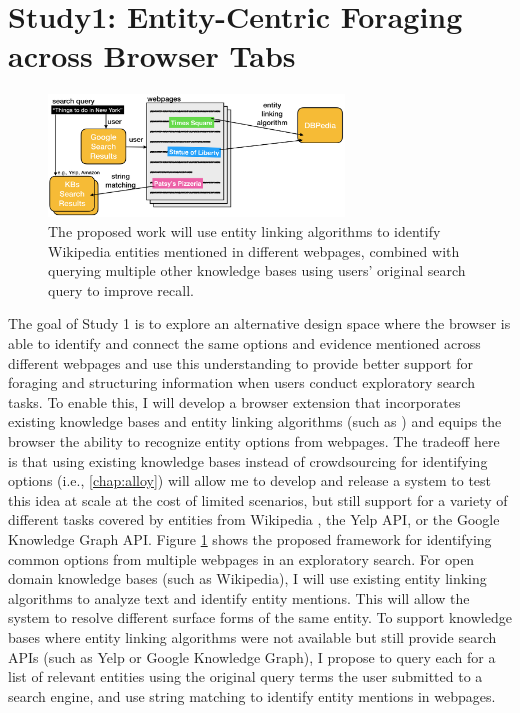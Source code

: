 
\section{Study1: Entity-Centric Foraging across Browser Tabs}

\begin{figure}
    \centering
    \includegraphics[width=0.7\textwidth]{images/linking.png}
    \caption{The proposed work will use entity linking algorithms to identify Wikipedia entities mentioned in different webpages, combined with querying multiple other knowledge bases using users' original search query to improve recall.}
    \label{fig:linking}
\end{figure}


The goal of Study 1 is to explore an alternative design space where the browser is able to identify and connect the same options and evidence mentioned across different webpages and use this understanding to provide better support for foraging and structuring information when users conduct exploratory search tasks. To enable this, I will develop a browser extension that incorporates existing knowledge bases and entity linking algorithms (such as \cite{spotlight,dbpedia}) and equips the browser the ability to recognize entity options from webpages. The tradeoff here is that using existing knowledge bases instead of crowdsourcing for identifying options (i.e., \cref{chap:alloy}) will allow me to develop and release a system to test this idea at scale at the cost of limited scenarios, but still support for a variety of different tasks covered by entities from Wikipedia \cite{dbpedia}, the Yelp API, or the Google Knowledge Graph API. Figure \ref{fig:linking} shows the proposed framework for identifying common options from multiple webpages in an exploratory search. For open domain knowledge bases (such as Wikipedia), I will use existing entity linking algorithms to analyze text and identify entity mentions. This will allow the system to resolve different surface forms of the same entity. To support knowledge bases where entity linking algorithms were not available but still provide search APIs (such as Yelp or Google Knowledge Graph), I propose to query each for a list of relevant entities using the original query terms the user submitted to a search engine, and use string matching to identify entity mentions in webpages.


